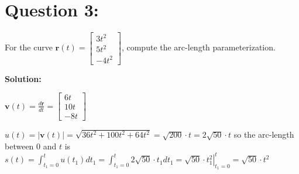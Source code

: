 \documentclass{article}
\newcommand{\abs}[1]{\left|#1\right|}
\newcommand{\colvec}[3]{\begin{bmatrix} #1 \\ #2 \\ #3 \end{bmatrix}}
\newcommand{\at}[1]{\left. #1 \right|}
\newcommand{\dr}[1]{\textcolor{dark_red}{#1}}
\begin{document}
%
%
%
%
%
%
%


\section*{Question 3:}

For the curve \(\mathbf{r}(t) = \colvec{3t^2}{5t^2}{-4t^2}\), compute the arc-length parameterization.

\vspace{0.5cm}

\dr{\bf Solution:}

\vspace{0.5cm}

\dr{\(\mathbf{v}(t) = \frac{d\mathbf{r}}{dt} = \colvec{6t}{10t}{-8t}\)}

\dr{\(u(t) = \abs{\mathbf{v}(t)} = \sqrt{36t^2 + 100t^2 + 64t^2} = \sqrt{200} \cdot t = 2\sqrt{50} \cdot t\) so the arc-length between \(0\) and \(t\) is \(s(t) = \int_{t_1 = 0}^t u(t_1)dt_1 = \int_{t_1 = 0}^t 2\sqrt{50} \cdot t_1dt_1 = \at{\sqrt{50} \cdot t_1^2}_{t_1=0}^t = \sqrt{50} \cdot t^2\)}
\end{document}
